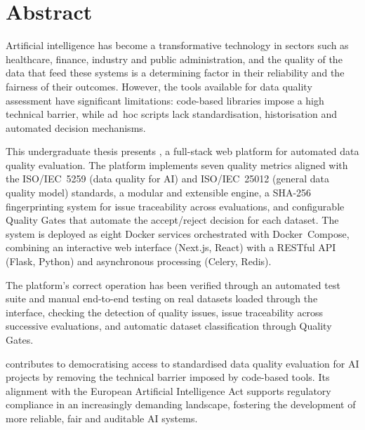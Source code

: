 \chapter{Abstract}

Artificial intelligence has become a transformative technology in sectors
such as healthcare, finance, industry and public administration, and the
quality of the data that feed these systems is a determining factor in their
reliability and the fairness of their outcomes.  However, the tools available
for data quality assessment have significant limitations: code-based
libraries impose a high technical barrier, while ad~hoc scripts lack
standardisation, historisation and automated decision mechanisms.

This undergraduate thesis presents \dataqual, a full-stack web platform for
automated data quality evaluation.  The platform implements seven quality
metrics aligned with the ISO/IEC~5259 (data quality for AI) and ISO/IEC~25012
(general data quality model) standards, a modular and extensible engine,
a SHA-256 fingerprinting system for issue traceability across evaluations,
and configurable Quality Gates that automate the accept/reject decision for
each dataset.  The system is deployed
as eight Docker services orchestrated with Docker~Compose, combining an
interactive web interface (Next.js, React) with a RESTful API
(Flask, Python) and asynchronous processing (Celery, Redis).

The platform's correct operation has been verified through an automated test
suite and manual end-to-end testing on real datasets loaded through the
interface, checking the detection of quality issues, issue traceability
across successive evaluations, and automatic dataset classification through
Quality Gates.

\dataqual contributes to democratising access to standardised data quality
evaluation for AI projects by removing the technical barrier imposed by
code-based tools.
Its alignment with the European Artificial Intelligence Act supports
regulatory compliance in an increasingly demanding landscape, fostering the
development of more reliable, fair and auditable AI systems.
